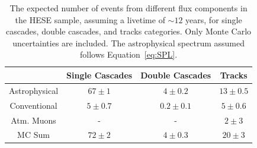 \begin{table}[h]
    \caption{The expected number of events from different flux components in the HESE sample, assuming a livetime of $\sim 12$ years, for single cascades, double cascades, and tracks categories. Only Monte Carlo uncertainties are included. The astrophysical spectrum assumed follows Equation~\ref{eq:SPL}.}
    
    \begin{tabular}{ c |c|c|c}
        
        \hline
        &Single Cascades &Double Cascades&Tracks\\
        \hline
        \hline
        Astrophysical&$67\pm1$& $4\pm0.2$ & $13\pm0.5$\\
        Conventional & $5\pm0.7$& $0.2\pm0.1$ &$5\pm0.6$\\
        Atm. Muons & - & - & $2\pm3$\\
        \hline
        MC Sum & $72\pm2$ & $4\pm0.3$ & $20\pm3$\\
        \hline
    \end{tabular}
\end{table}

